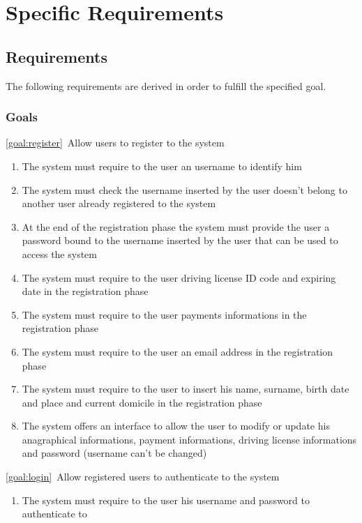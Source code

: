 \section{Specific Requirements}

\subsection{Requirements}
The following requirements are derived in order to fulfill the specified goal.
\subsubsection{Goals}
	\begin{description}
		\item \ref{goal:register}\ Allow users to register to the system
			\begin{enumerate}[label=\textbf{R\arabic*}]
  				\item The system must require to the user an username to identify him
   				\item The system must check the username inserted by the user doesn't belong to
   				another user already registered to the system 
   				\item At the end of the registration phase the system must provide the user a password
   				bound to the username inserted by the user that can be used to access the system
   				\item The system must require to the user driving license ID code and expiring date in the
   				registration phase
   				\item The system must require to the user payments informations in the registration phase
   				\item The system must require to the user an email address in the registration phase
   				\item The system must require to the user to insert his name, surname, birth date and
   				place and current domicile in the registration phase
   				\item The system offers an interface to allow the user to modify or update his
   				anagraphical informations, payment informations, driving license informations and
   				password (username can't be changed)
  			\end{enumerate}
		\item \ref{goal:login}\ Allow registered users to authenticate to the system
			\begin{enumerate}[resume*]
  				\item The system must require to the user his username and password to authenticate to

\end{enumerate}
\end{description}

